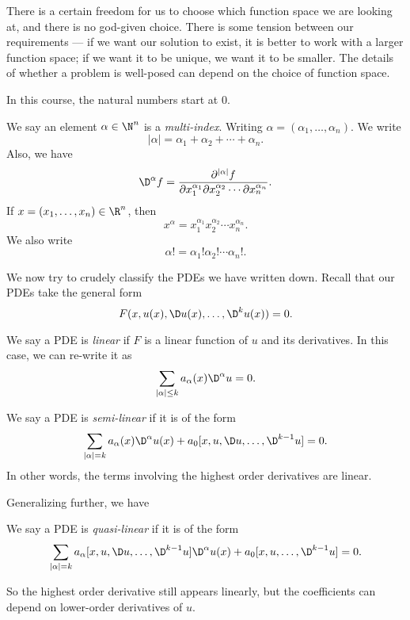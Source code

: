 \documentclass[a4paper]{article}
\begin{document}
There is a certain freedom for us to choose which function space we are looking at, and there is no god-given choice. There is some tension between our requirements --- if we want our solution to exist, it is better to work with a larger function space; if we want it to be unique, we want it to be smaller. The details of whether a problem is well-posed can depend on the choice of function space.

In this course, the natural numbers start at $0$.
\begin{notation}
  We say an element $\alpha \in \N^n$ is a \emph{multi-index}. Writing $\alpha = (\alpha_1, \ldots, \alpha_n)$. We write
  \[
    |\alpha| = \alpha_1 + \alpha_2 + \cdots + \alpha_n.
  \]
  Also, we have
  \[
    \D^\alpha f = \frac{\partial^{|\alpha|}f}{\partial x_1^{\alpha_1} \partial x_2^{\alpha_2} \cdots \partial x_n^{\alpha_n}}.
  \]
  If $x = (x_1, \ldots, x_n) \in \R^n$, then
  \[
    x^\alpha = x_1^{\alpha_1} x_2^{\alpha_2} \cdots x_n^{\alpha_n}.
  \]
  We also write
  \[
    \alpha! = \alpha_1! \alpha_2! \cdots \alpha_n!.
  \]
\end{notation}

We now try to crudely classify the PDEs we have written down. Recall that our PDEs take the general form
\[
  F(x, u(x), \D u(x), \ldots, \D^k u(x)) = 0.
\]

\begin{defi}
  We say a PDE is \emph{linear} if $F$ is a linear function of $u$ and its derivatives. In this case, we can re-write it as
  \[
    \sum_{|\alpha| \leq k} a_\alpha(x) \D^\alpha u = 0.
  \]
\end{defi}

\begin{defi}
  We say a PDE is \emph{semi-linear} if it is of the form
  \[
    \sum_{|\alpha| = k} a_\alpha(x) \D^\alpha u(x) + a_0[x, u, \D u, \ldots, \D^{k - 1} u] = 0.
  \]
  In other words, the terms involving the highest order derivatives are linear.
\end{defi}
Generalizing further, we have
\begin{defi}
  We say a PDE is \emph{quasi-linear} if it is of the form
  \[
    \sum_{|\alpha| = k} a_\alpha [x, u, \D u, \ldots, \D^{k - 1} u] \D^\alpha u(x) + a_0[x, u, \ldots, \D^{k - 1} u] = 0.
  \]
\end{defi}
So the highest order derivative still appears linearly, but the coefficients can depend on lower-order derivatives of $u$.
\end{document}
